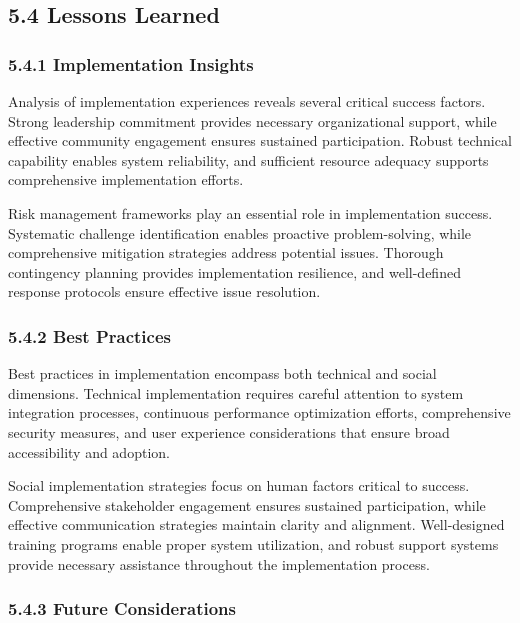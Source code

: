 \hypertarget{lessons-learned}{%
\subsection{5.4 Lessons Learned}\label{lessons-learned}}

\hypertarget{implementation-insights}{%
\subsubsection{5.4.1 Implementation Insights}\label{implementation-insights}}

Analysis of implementation experiences reveals several critical success factors. Strong leadership commitment provides necessary organizational support, while effective community engagement ensures sustained participation. Robust technical capability enables system reliability, and sufficient resource adequacy supports comprehensive implementation efforts.

Risk management frameworks play an essential role in implementation success. Systematic challenge identification enables proactive problem-solving, while comprehensive mitigation strategies address potential issues. Thorough contingency planning provides implementation resilience, and well-defined response protocols ensure effective issue resolution.

\hypertarget{best-practices}{%
\subsubsection{5.4.2 Best Practices}\label{best-practices}}

Best practices in implementation encompass both technical and social dimensions. Technical implementation requires careful attention to system integration processes, continuous performance optimization efforts, comprehensive security measures, and user experience considerations that ensure broad accessibility and adoption.

Social implementation strategies focus on human factors critical to success. Comprehensive stakeholder engagement ensures sustained participation, while effective communication strategies maintain clarity and alignment. Well-designed training programs enable proper system utilization, and robust support systems provide necessary assistance throughout the implementation process.

\hypertarget{future-considerations}{%
\subsubsection{5.4.3 Future Considerations}\label{future-considerations}}

